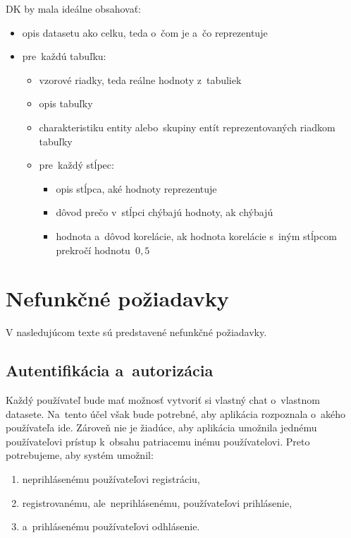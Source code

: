DK by mala ideálne obsahovať:
\begin{itemize}
\item opis datasetu ako celku, teda o~čom je a~čo reprezentuje

\item pre~každú tabuľku:
\begin{itemize}
\item vzorové riadky, teda reálne hodnoty z~tabuliek
\item opis tabuľky
\item charakteristiku entity alebo~skupiny entít reprezentovaných riadkom tabuľky
\item pre~každý stĺpec:
\begin{itemize}

\item opis stĺpca, aké hodnoty reprezentuje

\item dôvod prečo v~stĺpci chýbajú hodnoty, ak chýbajú

\item hodnota a~dôvod korelácie, ak hodnota korelácie s~iným stĺpcom prekročí hodnotu~$0,5$
\end{itemize}
\end{itemize}
\end{itemize}

\section{Nefunkčné požiadavky}

V nasledujúcom texte sú predstavené nefunkčné požiadavky.

\subsection{Autentifikácia a~autorizácia}
\label{auth-n-auth}

Každý používateľ bude mať možnosť vytvoriť si vlastný chat o~vlastnom datasete. Na~tento účel však bude potrebné, aby aplikácia rozpoznala o~akého používateľa ide. Zároveň nie je žiadúce, aby aplikácia umožnila jednému používateľovi prístup k~obsahu patriacemu inému používatelovi. Preto potrebujeme, aby systém umožnil:
\begin{enumerate}
\item neprihlásenému používateľovi registráciu,
\item registrovanému, ale~neprihlásenému, používateľovi prihlásenie,
\item a~prihlásenému používateľovi odhlásenie.
\end{enumerate}

